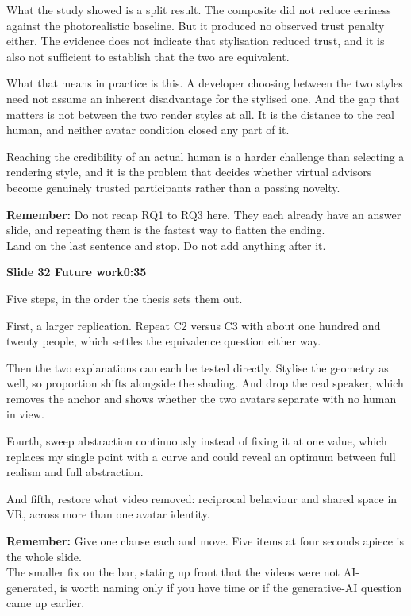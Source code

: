 \documentclass[11pt,a4paper]{article}
\newcommand{\slidehead}[3]{%
  \needspace{5\baselineskip}
  \vspace{0.9em}
  \noindent\colorbox{knblue}{\parbox{0.978\textwidth}{\vspace{1pt}\color{white}\textbf{Slide #1 \quad #2}\hfill\textbf{#3}\vspace{1pt}}}
  \vspace{0.35em}\par}
\newcommand{\remind}[1]{%
  \vspace{0.15em}
  \noindent\colorbox{knlight}{\parbox{0.972\textwidth}{\small\color{knblue}\textbf{Remember:} #1}}
  \vspace{0.2em}\par}
\begin{document}
What the study showed is a split result. The composite did not reduce eeriness against the photorealistic baseline. But it produced no observed trust penalty either. The evidence does not indicate that stylisation reduced trust, and it is also not sufficient to establish that the two are equivalent.

What that means in practice is this. A developer choosing between the two styles need not assume an inherent disadvantage for the stylised one. And the gap that matters is not between the two render styles at all. It is the distance to the real human, and neither avatar condition closed any part of it.

Reaching the credibility of an actual human is a harder challenge than selecting a rendering style, and it is the problem that decides whether virtual advisors become genuinely trusted participants rather than a passing novelty.

\remind{Do not recap RQ1 to RQ3 here. They each already have an answer slide, and repeating them is the fastest way to flatten the ending.\\[0.4em] Land on the last sentence and stop. Do not add anything after it.}

\slidehead{32}{Future work}{0:35}

Five steps, in the order the thesis sets them out.

First, a larger replication. Repeat C2 versus C3 with about one hundred and twenty people, which settles the equivalence question either way.

Then the two explanations can each be tested directly. Stylise the geometry as well, so proportion shifts alongside the shading. And drop the real speaker, which removes the anchor and shows whether the two avatars separate with no human in view.

Fourth, sweep abstraction continuously instead of fixing it at one value, which replaces my single point with a curve and could reveal an optimum between full realism and full abstraction.

And fifth, restore what video removed: reciprocal behaviour and shared space in VR, across more than one avatar identity.

\remind{Give one clause each and move. Five items at four seconds apiece is the whole slide.\\[0.4em] The smaller fix on the bar, stating up front that the videos were not AI-generated, is worth naming only if you have time or if the generative-AI question came up earlier.}
\end{document}
